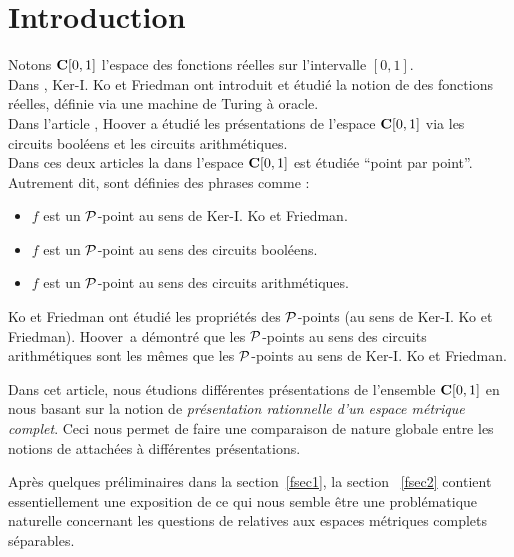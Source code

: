

\section*{Introduction}\label{fsec0}
Notons   ${{\bf C}[0,1]}$ l'espace des fonctions réelles \unicos sur l'intervalle 
$[0,1]$.\\
Dans \cite{fKF82}, Ker-I. Ko et Friedman ont introduit et étudié la notion de 
\com des fonctions réelles, définie via une machine de Turing à oracle. \\
Dans l'article  \cite{fHo90}, Hoover a étudié les présentations de l'espace 
${{\bf C}[0,1]}$ via les circuits booléens et les circuits arithmétiques.\\
Dans ces deux articles la \com dans l'espace  ${{\bf C}[0,1]}$  est étudiée ``point 
par point''.  \\
Autrement dit, sont définies des phrases comme : 
\begin{itemize}
\item $f$ est un ${\cal P}$-point au sens de Ker-I. Ko et Friedman.
\item $f$ est un ${\cal P}$-point au sens des circuits booléens.
\item $f$ est un ${\cal P}$-point au sens des circuits arithmétiques.
 \end{itemize}
Ko et Friedman ont étudié les propriétés des  ${\cal P}$-points  (au sens de 
Ker-I. Ko et Friedman).   
Hoover~a démontré que les  ${\cal P}$-points au sens des circuits arithmétiques sont 
les mêmes que les ${\cal P}$-points au sens de Ker-I. Ko et Friedman.

\smallskip  Dans cet article, nous étudions différentes présentations de 
l'ensemble  ${{\bf C}[0,1]}$  en nous basant sur la notion de {\em présentation 
rationnelle d'un espace métrique complet}. Ceci nous permet de faire une 
comparaison de nature globale entre les notions de \com attachées à 
différentes présentations.


 
\smallskip  Après quelques préliminaires dans la section~\ref{fsec1}, 
la section ~\ref{fsec2} contient  essentiellement une exposition de ce 
qui nous semble être une problématique naturelle concernant les 
questions de \com relatives aux espaces métriques complets séparables. 

